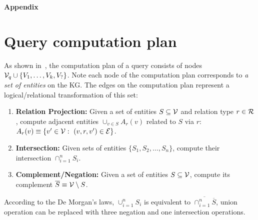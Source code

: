 

\newpage
\onecolumn
\appendix
\begin{center}
\begin{huge}
\textbf{Appendix}
\end{huge}
\end{center}

\section{Query computation plan}\label{app:computegraph}

As shown in~, the computation plan of a query consists of nodes $\mathcal{V}_q \cup \{V_1, \dots, V_k, V_?\}$. Note each node of the computation plan corresponds to \emph{a set of entities} on the KG. The edges on the computation plan represent a logical/relational transformation of this set:
\vspace{-1mm}
\begin{enumerate}[noitemsep,topsep=0pt,parsep=1pt,partopsep=0pt, leftmargin=*]
    \item \textbf{Relation Projection:} Given a set of entities $S \subseteq \mathcal{V}$ and relation type $r \in \mathcal{R}$, compute adjacent entities $\cup_{v \in S} A_r(v)$ related to $S$ via $r$: $A_r(v) \equiv \{v^{\prime} \in \mathcal{V}: \ (v, r, v^{\prime})\in\mathcal{E}\}$.
    \item \textbf{Intersection:} Given sets of entities $\{ S_1, S_2, \ldots, S_n\}$, compute their intersection $\cap_{i = 1}^n S_i$.
    \item \textbf{Complement/Negation:} Given a set of entities $S \subseteq \mathcal{V}$, compute its complement $\overline{S} \equiv \mathcal{V} \:\backslash\: S$.
\end{enumerate}
\vspace{-1mm}
According to the De Morgan's laws,  
$\cup_{i=1}^n S_i$ is equivalent to $\overline{\cap_{i=1}^n \overline{S}}$, union operation can be replaced with three negation and one intersection operations. 



